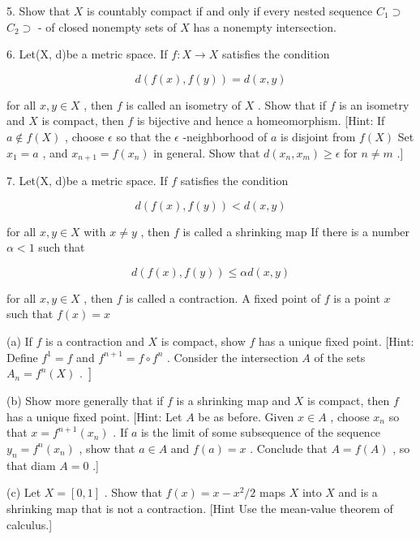 5. Show that \(X\) is countably compact if and only if every nested sequence \({C}_{1} \supset\)  \({C}_{2} \supset\) - of closed nonempty sets of \(X\) has a nonempty intersection.

6. Let(X, d)be a metric space. If \(f : X \rightarrow  X\) satisfies the condition

\[
d\left( {f\left( x\right) ,f\left( y\right) }\right)  = d\left( {x,y}\right)
\]

for all \(x,y \in  X\) , then \(f\) is called an isometry of \(X\) . Show that if \(f\) is an isometry and \(X\) is compact, then \(f\) is bijective and hence a homeomorphism. [Hint: If \(a \notin  f\left( X\right)\) , choose \(\epsilon\) so that the \(\epsilon\) -neighborhood of \(a\) is disjoint from \(f\left( X\right)\) Set \({x}_{1} = a\) , and \({x}_{n + 1} = f\left( {x}_{n}\right)\) in general. Show that \(d\left( {{x}_{n},{x}_{m}}\right)  \geq  \epsilon\) for \(n \neq  m\) .]

7. Let(X, d)be a metric space. If \(f\) satisfies the condition

\[
d\left( {f\left( x\right) ,f\left( y\right) }\right)  < d\left( {x,y}\right)
\]

for all \(x,y \in  X\) with \(x \neq  y\) , then \(f\) is called a shrinking map If there is a number \(\alpha  < 1\) such that

\[
d\left( {f\left( x\right) ,f\left( y\right) }\right)  \leq  {\alpha d}\left( {x,y}\right)
\]

for all \(x,y \in  X\) , then \(f\) is called a contraction. A fixed point of \(f\) is a point \(x\) such that \(f\left( x\right)  = x\)

(a) If \(f\) is a contraction and \(X\) is compact, show \(f\) has a unique fixed point. [Hint: Define \({f}^{1} = f\) and \({f}^{n + 1} = f \circ  {f}^{n}\) . Consider the intersection \(A\) of the sets \(\left. {{A}_{n} = {f}^{n}\left( X\right) \text{ . }}\right\rbrack\)

(b) Show more generally that if \(f\) is a shrinking map and \(X\) is compact, then \(f\) has a unique fixed point. [Hint: Let \(A\) be as before. Given \(x \in  A\) , choose \({x}_{n}\) so that \(x = {f}^{n + 1}\left( {x}_{n}\right)\) . If \(a\) is the limit of some subsequence of the sequence \({y}_{n} = {f}^{n}\left( {x}_{n}\right)\) , show that \(a \in  A\) and \(f\left( a\right)  = x\) . Conclude that \(A = f\left( A\right)\) , so that diam \(A = 0\) .]

(c) Let \(X = \left\lbrack  {0,1}\right\rbrack\) . Show that \(f\left( x\right)  = x - {x}^{2}/2\) maps \(X\) into \(X\) and is a shrinking map that is not a contraction. [Hint Use the mean-value theorem of calculus.]

